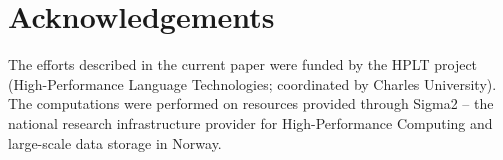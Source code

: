 \section*{Acknowledgements}
The efforts described in the current paper were funded by the HPLT project (High-Performance Language Technologies; coordinated by Charles University). The computations were performed on resources provided through Sigma2 -- the national research infrastructure provider for High-Performance Computing and large-scale data storage in Norway.

\clearpage
\onecolumn

